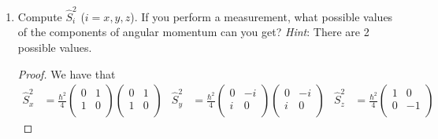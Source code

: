 \documentclass[../psets.tex]{subfiles}
\begin{document}
\begin{enumerate}
\begin{enumerate}
\begin{proof}
\begin{align*}
\begin{pmatrix}
                \end{pmatrix}\\
                &= i\hbar\cdot\frac{\hbar}{2}
                \begin{pmatrix}
                    0 & -i\\
                    i & 0\\
                \end{pmatrix}\\
                &= i\hbar\hat{S}_y
            \end{align*}
        \end{proof}
        \item Compute $\hat{S}_i^2$ ($i=x,y,z$). If you perform a measurement, what possible values of the components of angular momentum can you get? \emph{Hint}: There are 2 possible values.
        \begin{proof}
            We have that
            \begin{align*}
                \hat{S}_x^2 &= \frac{\hbar^2}{4}
                \begin{pmatrix}
                    0 & 1\\
                    1 & 0\\
                \end{pmatrix}
                \begin{pmatrix}
                    0 & 1\\
                    1 & 0\\
                \end{pmatrix}&
                    \hat{S}_y^2 &= \frac{\hbar^2}{4}
                    \begin{pmatrix}
                        0 & -i\\
                        i & 0\\
                    \end{pmatrix}
                    \begin{pmatrix}
                        0 & -i\\
                        i & 0\\
                    \end{pmatrix}&
                        \hat{S}_z^2 &= \frac{\hbar^2}{4}
                        \begin{pmatrix}
                            1 & 0\\
                            0 & -1\\
                        \end{pmatrix}

\end{align*}
\end{proof}
\end{enumerate}
\end{enumerate}
\end{document}
